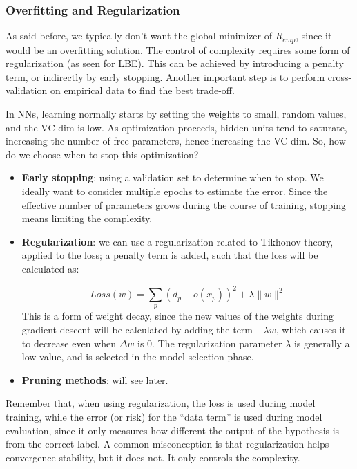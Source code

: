 \subsubsection{Overfitting and Regularization}

As said before, we typically don't want the global minimizer of $R_{emp}$, since it would be an overfitting solution. The control of complexity requires some form of regularization (as seen for LBE). This can be achieved by introducing a penalty term, or indirectly by early stopping. Another important step is to perform cross-validation on empirical data to find the best trade-off.

In NNs, learning normally starts by setting the weights to small, random values, and the VC-dim is low. As optimization proceeds, hidden units tend to saturate, increasing the number of free parameters, hence increasing the VC-dim. So, how do we choose when to stop this optimization?

\begin{itemize}
    \item \textbf{Early stopping}: using a validation set to determine when to stop. We ideally want to consider multiple epochs to estimate the error. Since the effective number of parameters grows during the course of training, stopping means limiting the complexity.

    \item \textbf{Regularization}: we can use a regularization related to Tikhonov theory, applied to the loss; a penalty term is added, such that the loss will be calculated as:

    \begin{equation*}
        Loss(w) = \sum_p (d_p - o(x_p))^2 + \lambda\|w\|^2
    \end{equation*}
    This is a form of weight decay, since the new values of the weights during gradient descent will be calculated by adding the term $- \lambda w$, which causes it to decrease even when $\Delta w$ is 0. The regularization parameter $\lambda$ is generally a low value, and is selected in the model selection phase.

    \item \textbf{Pruning methods}: will see later.
\end{itemize}

Remember that, when using regularization, the loss is used during model training, while the error (or risk) for the ``data term'' is used during model evaluation, since it only measures how different the output of the hypothesis is from the correct label. A common misconception is that regularization helps convergence stability, but it does not. It only controls the complexity.

